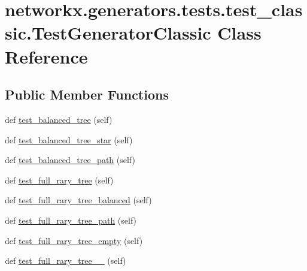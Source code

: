 \hypertarget{classnetworkx_1_1generators_1_1tests_1_1test__classic_1_1TestGeneratorClassic}{}\section{networkx.\+generators.\+tests.\+test\+\_\+classic.\+Test\+Generator\+Classic Class Reference}
\label{classnetworkx_1_1generators_1_1tests_1_1test__classic_1_1TestGeneratorClassic}
\subsection*{Public Member Functions}
\begin{DoxyCompactItemize}
\item 
def \hyperlink{classnetworkx_1_1generators_1_1tests_1_1test__classic_1_1TestGeneratorClassic_a5be7df07b5143d50d1982431d7975f5d}{test\+\_\+balanced\+\_\+tree} (self)
\item 
def \hyperlink{classnetworkx_1_1generators_1_1tests_1_1test__classic_1_1TestGeneratorClassic_a8617665c794f8231eef59dc54521c3cd}{test\+\_\+balanced\+\_\+tree\+\_\+star} (self)
\item 
def \hyperlink{classnetworkx_1_1generators_1_1tests_1_1test__classic_1_1TestGeneratorClassic_aaeacf4f1f80cbe886b131c80a200ec4f}{test\+\_\+balanced\+\_\+tree\+\_\+path} (self)
\item 
def \hyperlink{classnetworkx_1_1generators_1_1tests_1_1test__classic_1_1TestGeneratorClassic_a551c9a9f22a5f8c865ac31afcfc94c74}{test\+\_\+full\+\_\+rary\+\_\+tree} (self)
\item 
def \hyperlink{classnetworkx_1_1generators_1_1tests_1_1test__classic_1_1TestGeneratorClassic_a1ff70a884bd199276ba69a7aef0aba27}{test\+\_\+full\+\_\+rary\+\_\+tree\+\_\+balanced} (self)
\item 
def \hyperlink{classnetworkx_1_1generators_1_1tests_1_1test__classic_1_1TestGeneratorClassic_a7fffca8ec397dce3f8babe6b1e877d8c}{test\+\_\+full\+\_\+rary\+\_\+tree\+\_\+path} (self)
\item 
def \hyperlink{classnetworkx_1_1generators_1_1tests_1_1test__classic_1_1TestGeneratorClassic_ab866aa886ff2936800550921f4723037}{test\+\_\+full\+\_\+rary\+\_\+tree\+\_\+empty} (self)
\item 
def \hyperlink{classnetworkx_1_1generators_1_1tests_1_1test__classic_1_1TestGeneratorClassic_a312a4f835f2790242c0ec8456768f114}{test\+\_\+full\+\_\+rary\+\_\+tree\+\_\+\_} (self)

\end{DoxyCompactItemize}
